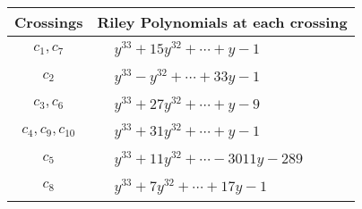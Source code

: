 \documentclass[1p]{elsarticle_modified}
\theoremstyle{definition}
\begin{document}
\begin{tabular}{m{50pt}|m{274pt}}
Crossings & \hspace{64pt}Riley Polynomials at each crossing \\
\hline $$\begin{aligned}c_{1},c_{7}\end{aligned}$$&$\begin{aligned}
&y^{33}+15 y^{32}+\cdots+y-1
\end{aligned}$\\
\hline $$\begin{aligned}c_{2}\end{aligned}$$&$\begin{aligned}
&y^{33}- y^{32}+\cdots+33 y-1
\end{aligned}$\\
\hline $$\begin{aligned}c_{3},c_{6}\end{aligned}$$&$\begin{aligned}
&y^{33}+27 y^{32}+\cdots+y-9
\end{aligned}$\\
\hline $$\begin{aligned}c_{4},c_{9},c_{10}\end{aligned}$$&$\begin{aligned}
&y^{33}+31 y^{32}+\cdots+y-1
\end{aligned}$\\
\hline $$\begin{aligned}c_{5}\end{aligned}$$&$\begin{aligned}
&y^{33}+11 y^{32}+\cdots-3011 y-289
\end{aligned}$\\
\hline $$\begin{aligned}c_{8}\end{aligned}$$&$\begin{aligned}
&y^{33}+7 y^{32}+\cdots+17 y-1
\end{aligned}$\\
\hline
\end{tabular}
\vskip 2pc
\end{document}
